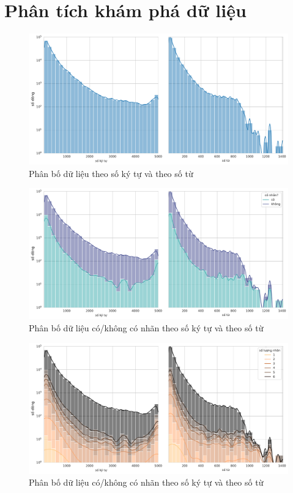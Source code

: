 \section*{Phân tích khám phá dữ liệu}
\begin{figure}[htb!]
    \centering
    \includegraphics[width=\textwidth]{chapter_2/image/dist_num_chars_and_words.pdf}
    \caption{Phân bố dữ liệu theo số ký tự và theo số từ}
    \label{figure:dist_num_chars_and_words}
\end{figure}
\begin{figure}[htb!]
    \centering
    \includegraphics[width=\textwidth]{chapter_2/image/dist_num_chars_and_words_by_has_label.pdf}
    \caption{Phân bố dữ liệu có/không có nhãn theo số ký tự và theo số từ}
\end{figure}
\begin{figure}[htb!]
    \centering
    \includegraphics[width=\textwidth]{chapter_2/image/dist_num_chars_and_words_per_num_labels.pdf}
    \caption{Phân bố dữ liệu có/không có nhãn theo số ký tự và theo số từ}
\end{figure}

